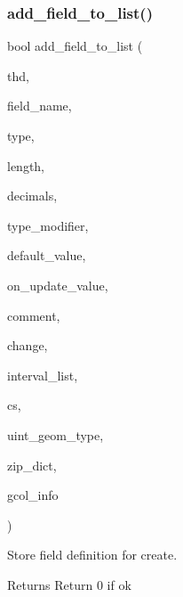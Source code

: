 \subsubsection{\texorpdfstring{add\+\_\+field\+\_\+to\+\_\+list()}{add\_field\_to\_list()}}
{\footnotesize\ttfamily bool add\+\_\+field\+\_\+to\+\_\+list (\begin{DoxyParamCaption}\item[{T\+HD $\ast$}]{thd,  }\item[{L\+E\+X\+\_\+\+S\+T\+R\+I\+NG $\ast$}]{field\+\_\+name,  }\item[{enum\+\_\+field\+\_\+types}]{type,  }\item[{char $\ast$}]{length,  }\item[{char $\ast$}]{decimals,  }\item[{uint}]{type\+\_\+modifier,  }\item[{\mbox{\hyperlink{classItem}{Item}} $\ast$}]{default\+\_\+value,  }\item[{\mbox{\hyperlink{classItem}{Item}} $\ast$}]{on\+\_\+update\+\_\+value,  }\item[{L\+E\+X\+\_\+\+S\+T\+R\+I\+NG $\ast$}]{comment,  }\item[{char $\ast$}]{change,  }\item[{\mbox{\hyperlink{classList}{List}}$<$ String $>$ $\ast$}]{interval\+\_\+list,  }\item[{const C\+H\+A\+R\+S\+E\+T\+\_\+\+I\+N\+FO $\ast$}]{cs,  }\item[{uint}]{uint\+\_\+geom\+\_\+type,  }\item[{const L\+E\+X\+\_\+\+C\+S\+T\+R\+I\+NG $\ast$}]{zip\+\_\+dict,  }\item[{\mbox{\hyperlink{classGenerated__column}{Generated\+\_\+column}} $\ast$}]{gcol\+\_\+info }\end{DoxyParamCaption})}

Store field definition for create.

\begin{DoxyReturn}{Returns}
Return 0 if ok 
\end{DoxyReturn}
\mbox{\label{group__Runtime__Environment_gaa70b34c69515f56b1d43caa55824d5d5}} 
